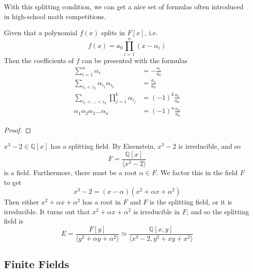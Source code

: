   With this splitting condition, we can get a nice set of formulas often introduced in high-school math competitions. 

  \begin{theorem}
    Given that a polynomial $f(x)$ splits in $F[x]$, i.e.
    \begin{equation}
      f(x) = a_0 \prod_{i = 1}^{n} (x - \alpha_i)
    \end{equation}
    Then the coefficients of $f$ can be presented with the formulas
    \begin{align}
      \sum_{i=1}^n \alpha_i & = - \frac{a_1}{a_0} \\
      \sum_{i_1 < i_2} \alpha_{i_1} \alpha_{i_2} & = \frac{a_2}{a_0} \\
      \sum_{i_1< ...< i_k} \prod_{j = 1}^{k} \alpha_{i_j} & = (-1)^k \frac{a_k}{a_0} \\
      \alpha_1 \alpha_2 \alpha_3 ... \alpha_n & = (-1)^n \frac{a_n}{a_0}
    \end{align}
  \end{theorem}
  \begin{proof}
    
  \end{proof}

  \begin{example}
    $x^3 - 2 \in \mathbb{Q}[x]$ has a splitting field. By Eisenstein, $x^3 - 2$ is irreducible, and so 
    \begin{equation}
      F = \frac{\mathbb{Q}[x]}{\langle x^3 - 2 \rangle} 
    \end{equation}
    is a field. Furthermore, there must be a root $\alpha \in F$. We factor this in the field $F$ to get 
    \begin{equation}
      x^3 - 2 = (x - \alpha) (x^2 + \alpha x + \alpha^2) 
    \end{equation}
    Then either $x^2 + \alpha x + \alpha^2$ has a root in $F$ and $F$ is the splitting field, or it is irreducible. It turns out that $x^2 + \alpha x + \alpha^2$ is irreducible in $F$, and so the splitting field is 
    \begin{equation}
      E = \frac{F[y]}{\langle y^2 + \alpha y + \alpha^2 \rangle} \simeq \frac{\mathbb{Q}[x, y]}{\langle x^3 - 2, y^2 + xy + x^2 \rangle}
    \end{equation}
  \end{example}

\subsection{Finite Fields} 

